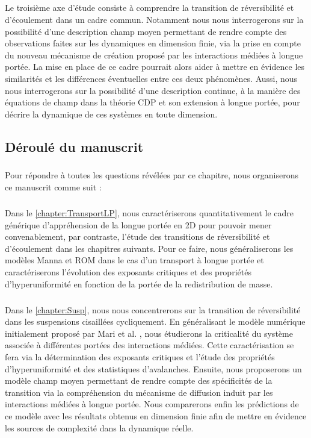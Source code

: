 \subparagraph{}Le troisième axe d'étude consiste à comprendre la transition de réversibilité et d'écoulement dans un cadre commun. Notamment nous nous interrogerons sur la possibilité d'une description champ moyen permettant de rendre compte des observations faites sur les dynamiques en dimension finie, via la prise en compte du nouveau mécanisme de création proposé par les interactions médiées à longue portée. La mise en place de ce cadre pourrait alors aider à mettre en évidence les similarités et les différences éventuelles entre ces deux phénomènes. Aussi, nous nous interrogerons sur la possibilité d'une description continue, à la manière des équations de champ dans la théorie CDP et son extension à longue portée, pour décrire la dynamique de ces systèmes en toute dimension.

\subsection{Déroulé du manuscrit}

\subparagraph{}Pour répondre à toutes les questions révélées par ce chapitre, nous organiserons ce manuscrit comme suit :

\subparagraph{}Dans le \autoref{chapter:TransportLP}, nous caractériserons quantitativement le cadre générique d'appréhension de la longue portée en 2D pour pouvoir mener convenablement, par contraste, l'étude des transitions de réversibilité et d'écoulement dans les chapitres suivants. Pour ce faire, nous généraliserons les modèles Manna et ROM dans le cas d'un transport à longue portée et caractériserons l'évolution des exposants critiques et des propriétés d'hyperuniformité en fonction de la portée de la redistribution de masse. 

\subparagraph{}Dans le \autoref{chapter:Susp}, nous nous concentrerons sur la transition de réversibilité dans les suspensions cisaillées cycliquement. En généralisant le modèle numérique initialement proposé par Mari et al. \cite{mari_absorbing_2022}, nous étudierons la criticalité du système associée à différentes portées des interactions médiées. Cette caractérisation se fera via la détermination des exposants critiques et l'étude des propriétés d'hyperuniformité et des statistiques d'avalanches. Ensuite, nous proposerons un modèle champ moyen permettant de rendre compte des spécificités de la transition via la compréhension du mécanisme de diffusion induit par les interactions médiées à longue portée. Nous comparerons enfin les prédictions de ce modèle avec les résultats obtenus en dimension finie afin de mettre en évidence les sources de complexité dans la dynamique réelle.

